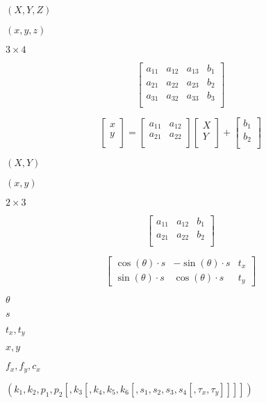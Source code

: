 \documentclass{article}
\begin{document}
$(X,Y,Z)$
\pagebreak

$(x,y,z)$
\pagebreak

$3 \times 4$
\pagebreak

\[ \begin{bmatrix} a_{11} & a_{12} & a_{13} & b_1\\ a_{21} & a_{22} & a_{23} & b_2\\ a_{31} & a_{32} & a_{33} & b_3\\ \end{bmatrix} \]
\pagebreak

\[ \begin{bmatrix} x\\ y\\ \end{bmatrix} = \begin{bmatrix} a_{11} & a_{12}\\ a_{21} & a_{22}\\ \end{bmatrix} \begin{bmatrix} X\\ Y\\ \end{bmatrix} + \begin{bmatrix} b_1\\ b_2\\ \end{bmatrix} \]
\pagebreak

$(X,Y)$
\pagebreak

$(x,y)$
\pagebreak

$2 \times 3$
\pagebreak

\[ \begin{bmatrix} a_{11} & a_{12} & b_1\\ a_{21} & a_{22} & b_2\\ \end{bmatrix} \]
\pagebreak

\[ \begin{bmatrix} \cos(\theta) \cdot s & -\sin(\theta) \cdot s & t_x \\ \sin(\theta) \cdot s & \cos(\theta) \cdot s & t_y \end{bmatrix} \]
\pagebreak

$ \theta $
\pagebreak

$ s $
\pagebreak

$ t_x, t_y $
\pagebreak

$ x, y $
\pagebreak

$f_x, f_y, c_x$
\pagebreak

$(k_1, k_2, p_1, p_2[, k_3[, k_4, k_5, k_6[, s_1, s_2, s_3, s_4[, \tau_x, \tau_y]]]])$
\pagebreak
\end{document}
